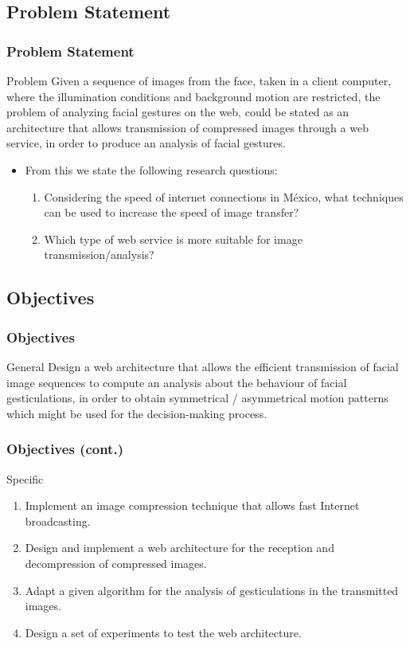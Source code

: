 \documentclass[compress]{beamer}
\begin{document}
\subsection{Problem Statement}
\begin{frame}
	\frametitle{Problem Statement}
	\begin{alertblock}{Problem}
	Given a sequence of images from the face, taken in a client computer, where the illumination conditions and background motion are restricted, the problem of analyzing facial gestures on the web, could be stated as an architecture that allows transmission of compressed images through a web service, in order to produce an analysis of facial gestures.
	\end{alertblock}

	\begin{itemize}
		\item From this we state the following research questions:
		\begin{enumerate}
			\item Considering the speed of internet connections in M\'exico, what techniques can be used to increase the speed of image transfer?
			\item Which type of web service is more suitable for image transmission/analysis?
		\end{enumerate}
	\end{itemize}
\end{frame}

\subsection{Objectives}
\begin{frame}
	\frametitle{Objectives}
	\begin{block}{General}
	Design a web architecture that allows the efficient transmission of facial image sequences to compute an analysis about the behaviour of facial gesticulations, in order to obtain symmetrical / asymmetrical motion patterns which might be used for the decision-making process.
	\end{block}
\end{frame}

\begin{frame}
	\frametitle{Objectives (cont.)}
	\begin{block}{Specific}
		\begin{enumerate}
		\item Implement an image compression technique that allows fast Internet broadcasting.
		\item Design and implement a web architecture for the reception and decompression of compressed images.
		\item Adapt a given algorithm for the analysis of gesticulations in the transmitted images.
		\item Design a set of experiments to test the web architecture.
		\end{enumerate}
	\end{block}
\end{frame}
\end{document}
